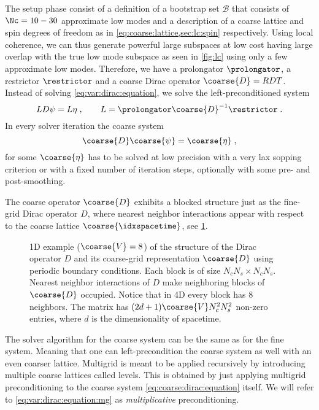 The setup phase consist of a definition of a bootstrap set $\mathcal{B}$ that consists of $\Nc = 10-30$ approximate low modes and a description of a coarse lattice and spin degrees of freedom as in \cref{eq:coarse:lattice,sec:lc:spin} respectively.
Using local coherence, we can thus generate powerful large subspaces at low cost having large overlap with the true low mode subspace as seen in \cref{fig:lc} using only a few approximate low modes.
Therefore, we have a prolongator $\prolongator$, a restrictor $\restrictor$ and a coarse Dirac operator $\coarse{D} = RDT$.
Instead of solving \cref{eq:var:dirac:equation}, we solve the left-preconditioned system
\begin{equation} \label{eq:var:dirac:equation:mg}
L D \psi = L \eta \;,
\qquad
L = \prolongator \coarse{D}^{-1} \restrictor \;.
\end{equation}
In every solver iteration the coarse system
\begin{equation} \label{eq:coarse:dirac:equation}
\coarse{D} \coarse{\psi} = \coarse{\eta} \;,
\end{equation}
for some $\coarse{\eta}$ has to be solved at low precision with a very lax sopping criterion or with a fixed number of iteration steps, optionally with some pre- and post-smoothing.

The coarse operator $\coarse{D}$ exhibits a blocked structure just as the fine-grid Dirac operator $D$, where nearest neighbor interactions appear with respect to the coarse lattice $\coarse{\idxspacetime}$, see \cref{fig:coarse:op:structure}.
\begin{figure}
\centering

\caption{
1D example ($\coarse{V} = 8$) of the structure of the Dirac operator $D$ and its coarse-grid representation $\coarse{D}$ using periodic boundary conditions.
Each block is of size $N_c N_s \times N_c N_s$.
Nearest neighbor interactions of $D$ make neighboring blocks of $\coarse{D}$ occupied.
Notice that in 4D every block has \num{8} neighbors.
The matrix has $(2d+1)\coarse{V} N_c^2 N_s^2$ non-zero entries, where $d$ is the dimensionality of spacetime.
\takenfull
}
\label{fig:coarse:op:structure}
\end{figure}
The solver algorithm for the coarse system can be the same as for the fine system.
Meaning that one can left-precondition the coarse system as well with an even coarser lattice.
Multigrid is meant to be applied recursively by introducing multiple coarse lattices called levels.
This is obtained by just applying multigrid preconditioning to the coarse system \cref{eq:coarse:dirac:equation} itself.
We will refer to \cref{eq:var:dirac:equation:mg} as \emph{multiplicative} preconditioning.

